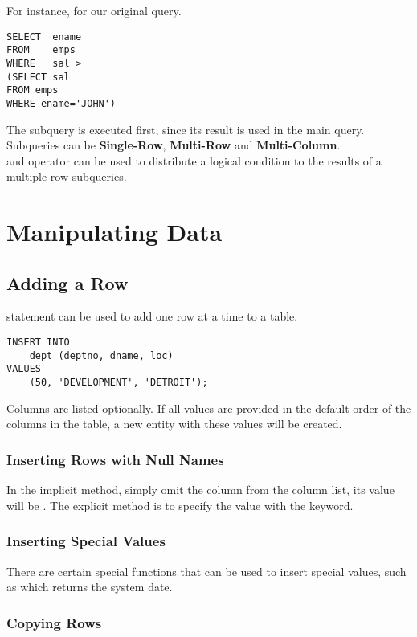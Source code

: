 \documentclass[11pt,a4paper,twocolumn]{book}
\begin{document}
For instance, for our original query.

\begin{lstlisting}
SELECT	ename
FROM	emps
WHERE	sal >
(SELECT sal
FROM emps
WHERE ename='JOHN')
\end{lstlisting}

The subquery is executed first, since its result is used in the main query. Subqueries can be \textbf{Single-Row}, \textbf{Multi-Row} and \textbf{Multi-Column}.\\

 and  operator can be used to distribute a logical condition to the results of a multiple-row subqueries.

\section{Manipulating Data}

\subsection{Adding a Row}

 statement can be used to add one row at a time to a table.

\begin{lstlisting}
INSERT INTO
	dept (deptno, dname, loc)
VALUES
	(50, 'DEVELOPMENT', 'DETROIT');
\end{lstlisting}

Columns are listed optionally. If all values are provided in the default order of the columns in the table, a new entity with these values will be created.

\subsubsection{Inserting Rows with Null Names}

In the implicit method, simply omit the column from the column list, its value will be . The explicit method is to specify the  value with the  keyword.

\subsubsection{Inserting Special Values}

There are certain special functions that can be used to insert special values, such as  which returns the system date.

\subsubsection{Copying Rows}
\end{document}
